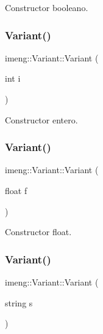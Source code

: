Constructor booleano. 

\mbox{\label{classimeng_1_1_variant_a2934c515bb27d47990837f5a95b4c89c}} 
\subsubsection{Variant()\hspace{0.1cm}{\footnotesize\ttfamily [3/5]}}
{\footnotesize\ttfamily imeng\+::\+Variant\+::\+Variant (\begin{DoxyParamCaption}\item[{int}]{i }\end{DoxyParamCaption})\hspace{0.3cm}{\ttfamily [inline]}}



Constructor entero. 

\mbox{\label{classimeng_1_1_variant_aab8fe33a95a056da1258840d5446f55b}} 
\subsubsection{Variant()\hspace{0.1cm}{\footnotesize\ttfamily [4/5]}}
{\footnotesize\ttfamily imeng\+::\+Variant\+::\+Variant (\begin{DoxyParamCaption}\item[{float}]{f }\end{DoxyParamCaption})\hspace{0.3cm}{\ttfamily [inline]}}



Constructor float. 

\mbox{\label{classimeng_1_1_variant_a3ef4751538789835d74d00d73bfb8d51}} 
\subsubsection{Variant()\hspace{0.1cm}{\footnotesize\ttfamily [5/5]}}
{\footnotesize\ttfamily imeng\+::\+Variant\+::\+Variant (\begin{DoxyParamCaption}\item[{string}]{s }\end{DoxyParamCaption})\hspace{0.3cm}{\ttfamily [inline]}}



